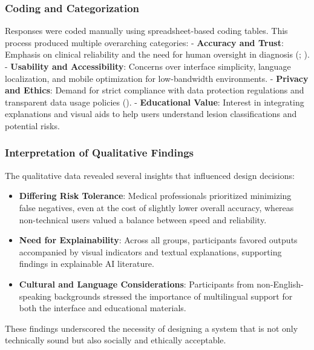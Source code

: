 \documentclass[
  12pt,
  oneside]{article}
\providecommand{\tightlist}{%
  \setlength{\itemsep}{0pt}\setlength{\parskip}{0pt}}
\begin{document}
\subsubsection{Coding and
Categorization}\label{coding-and-categorization}

Responses were coded manually using spreadsheet-based coding tables.
This process produced multiple overarching categories: -
\textbf{Accuracy and Trust}: Emphasis on clinical reliability and the
need for human oversight in diagnosis
(;
). - \textbf{Usability
and Accessibility}: Concerns over interface simplicity, language
localization, and mobile optimization for low-bandwidth environments. -
\textbf{Privacy and Ethics}: Demand for strict compliance with data
protection regulations and transparent data usage policies
(). - \textbf{Educational
Value}: Interest in integrating explanations and visual aids to help
users understand lesion classifications and potential risks.

\subsubsection{Interpretation of Qualitative
Findings}\label{interpretation-of-qualitative-findings}

The qualitative data revealed several insights that influenced design
decisions:

\begin{itemize}
\tightlist
\item
  \textbf{Differing Risk Tolerance}: Medical professionals prioritized
  minimizing false negatives, even at the cost of slightly lower overall
  accuracy, whereas non-technical users valued a balance between speed
  and reliability.
\item
  \textbf{Need for Explainability}: Across all groups, participants
  favored outputs accompanied by visual indicators and textual
  explanations, supporting findings in explainable AI literature.
\item
  \textbf{Cultural and Language Considerations}: Participants from
  non-English-speaking backgrounds stressed the importance of
  multilingual support for both the interface and educational materials.
\end{itemize}

These findings underscored the necessity of designing a system that is
not only technically sound but also socially and ethically acceptable.
\end{document}
